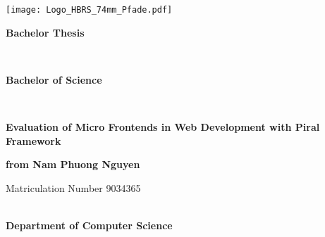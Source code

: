 \documentclass[a4paper]{book}
\def\autor{Nam Phuong Nguyen}
\begin{document}
\sloppy
\pagestyle{headings}

\begin{titlepage}
  \begin{minipage}{0.5\textwidth}
	\raggedright 
	\texttt{[image: Logo\_HBRS\_74mm\_Pfade.pdf]}
  \end{minipage}
  \hspace{1cm}
  \begin{minipage}{0.5\textwidth}
	\raggedleft 
  \end{minipage}
  
  \renewcommand{\baselinestretch}{1.4}\normalsize
  \vspace{2cm}
  \begin{center}

    \begin{Huge}\textbf{Bachelor Thesis}\end{Huge} \\
    \vspace{0.8cm}
    \begin{Large}\textbf{Bachelor of Science}\end{Large} \\

    \vspace{2.2cm}
    \renewcommand{\baselinestretch}{1.2}\normalsize
    \begin{huge}
      \textbf{Evaluation of Micro Frontends in Web Development with Piral Framework
 \\}
    \end{huge}
    \renewcommand{\baselinestretch}{1.5}\normalsize
    \vspace{0.7cm}

    \begin{Large}\textbf{from \autor\ \\}
    \end{Large}
    Matriculation Number 9034365 \\ ~\\
    \begin{Large}
        \textbf{Department of Computer Science}
    \end{Large}

  \end{center}

  \vspace{5.0cm}


\end{titlepage}
\end{document}
